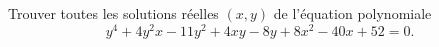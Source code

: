 Trouver toutes les solutions réelles $(x, y)$ de l'équation polynomiale
\[ y^4 + 4y^2x - 11y^2 + 4xy - 8y + 8x^2 - 40x + 52 = 0. \]
